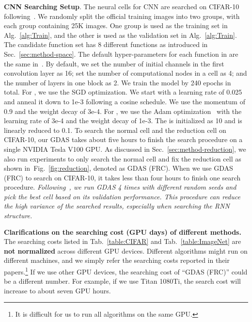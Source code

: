 \documentclass[10pt,twocolumn,letterpaper]{article}
\def\Figref#1{Fig.~\ref{#1}}
\def\Secref#1{Sec.~\ref{#1}}
\def\Algref#1{Alg.~\ref{#1}}
\def\Tabref#1{Tab.~\ref{#1}}
\begin{document}
\textbf{CNN Searching Setup}.
The neural cells for CNN are searched on CIFAR-10 following~\cite{zoph2017NAS,Zoph_2018_CVPR,Liu_2018_ECCV,pmlr-v80-pham18a}.
We randomly split the official training images into two groups, with each group containing 25K images. One group is used as the training set  in \Algref{alg:Train}, and the other is used as the validation set  in \Algref{alg:Train}.
The candidate function set  has 8 different functions as introduced in \Secref{sec:method-space}.
The default hyper-parameters for each function in  are the same in~\cite{liu2019darts,Zoph_2018_CVPR,Liu_2018_ECCV}.
By default, we set the number of initial channels in the first convolution layer  as 16; set the number of computational nodes in a cell  as 4; and the number of layers in one block  as 2.
We train the model by 240 epochs in total.
For , we use the SGD optimization. We start with a learning rate of 0.025 and anneal it down to 1e-3 following a cosine schedule. We use the momentum of 0.9 and the weight decay of 3e-4.
For , we use the Adam optimization~\cite{kingma2015adam} with the learning rate of 3e-4 and the weight decay of 1e-3.
The  is initialized as 10 and is linearly reduced to {0.1}.
To search the normal cell and the reduction cell on CIFAR-10, our GDAS takes about five hours to finish the search procedure on a single NVIDIA Tesla V100 GPU.
As discussed in \Secref{sec:method-reduction}, we also run experiments to only search the normal cell and fix the reduction cell as shown in~\Figref{fig:reduction}, denoted as GDAS (FRC).
When we use GDAS (FRC) to search on CIFAR-10, it takes less than four hours to finish one search procedure.
\textit{Following~\cite{liu2019darts}, we run GDAS 4 times with different random seeds and pick the best cell based on its validation performance. This procedure can reduce the high variance of the searched results, especially when searching the RNN structure.}


\textbf{Clarifications on the searching cost (GPU days) of different methods.}
The searching costs listed in \Tabref{table:CIFAR} and \Tabref{table:ImageNet} are \textbf{not normalized} across different GPU devices. Different algorithms might run on different machines, and we simply refer the searching costs reported in their papers.\footnote{It is difficult for us to run all algorithms on the same GPU.}
If we use other GPU devices, the searching cost of ``GDAS (FRC)'' could be a different number. For example, if we use Titan 1080Ti, the search cost will increase to about seven GPU hours. 
\end{document}
